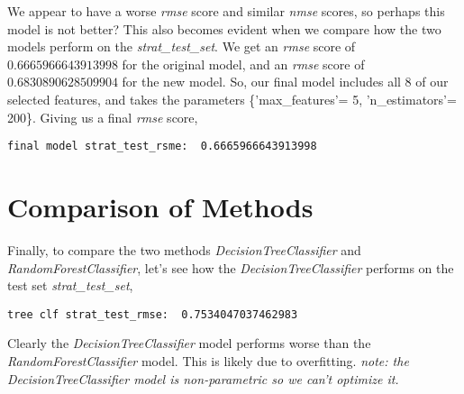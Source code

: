 \documentclass[8pt]{article}
\begin{document}
We appear to have a worse \textit{rmse} score and similar \textit{nmse} scores, so perhaps this model is not better? This also becomes evident when we compare how the two models perform on the \textit{strat\_test\_set}. We get an \textit{rmse} score of $0.6665966643913998$ for the original model, and an \textit{rmse} score of $0.6830890628509904$ for the new model. So, our final model includes all 8 of our selected features, and takes the parameters \{'max\_features'= 5, 'n\_estimators'= 200\}. Giving us a final \textit{rmse} score,
\newline
\newline
\begin{adjustbox}{max width=\textwidth}
\begin{lstlisting}
final model strat_test_rsme:  0.6665966643913998
\end{lstlisting}
\end{adjustbox}
\section{Comparison of Methods}
Finally, to compare the two methods \textit{DecisionTreeClassifier} and \textit{RandomForestClassifier}, let's see how the \textit{DecisionTreeClassifier} performs on the test set \textit{strat\_test\_set},
\newline
\newline
\begin{adjustbox}{max width=\textwidth}
\begin{lstlisting}
tree clf strat_test_rmse:  0.7534047037462983
\end{lstlisting}
\end{adjustbox}
\newline
\newline
Clearly the \textit{DecisionTreeClassifier} model performs worse than the \textit{RandomForestClassifier} model. This is likely due to overfitting.
\newline
\textit{note: the DecisionTreeClassifier model is non-parametric so we can't optimize it. }
\end{document}
